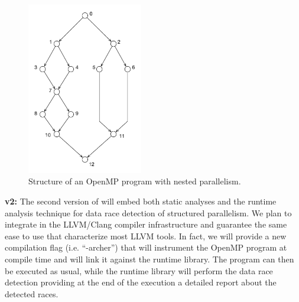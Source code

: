 \begin{figure}
  \centering
  \includegraphics[width=0.45\textwidth]{figures/example01}
  \caption{Structure of an OpenMP program with nested parallelism.}
  \label{fig:example01}
\end{figure}

\textbf{\archer v2:} The second version of \archer will embed both static
analyses and the runtime analysis technique for data race detection of
structured parallelism.
%
We plan to integrate \archer in the LLVM/Clang compiler infrastructure and
guarantee the same ease to use that characterize most LLVM tools.
%
In fact, we will provide a new compilation flag (i.e. ``-archer'') that will
instrument the OpenMP program at compile time and will link it against the
\archer runtime library.
%
The program can then be executed as usual, while the \archer runtime library
will perform the data race detection providing at the end of the execution a
detailed report about the detected races.

